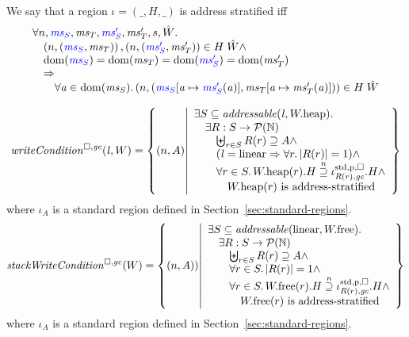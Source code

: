 \documentclass[a4paper]{article}
\begin{document}
\begin{definition}
  \label{def:address-stratified}
  We say that a region $\iota = (\_,H,\_)$ is address stratified iff
  \[
    \begin{array}{l}
      \forall n, \src{\ms_S},\ms_T,\src{\ms_S'},\ms_T',s,\hat{W}\ldotp \\
      \quad \npair{\stpair{\ms}{\ms}}, \npair{\stpair[.]{\ms_S'}{\ms_T'}} \in H \; \hat{W} \wedge \\
      \quad \dom(\src{\ms_S}) = \dom(\ms_T) = \dom(\src{\ms_S'}) = \dom(\ms_T') \\
      \quad \Rightarrow \\
      \qquad \forall \aaddr \in \dom(\ms_S) \ldotp \npair{(\src{\ms_S}\update{\aaddr}{\src{\ms_S'}(\aaddr)},\ms_T\update{\aaddr}{\ms_T'(\aaddr)})} \in H \; \hat{W}
    \end{array}
  \]
\end{definition}

\[
  \writeCond{\lin,W} = \left\{ \npair{A} \middle| 
    \begin{array}{l}
      \exists S \subseteq \addressable{\lin, \pwheap} \ldotp \\
      \quad \exists R : S \fun \powerset{\nats} \\
      \qquad \biguplus_{r\in S} R(r) \supseteq A \wedge\\
      \qquad (\lin = \linear \Rightarrow \forall r\ldotp |R(r)|  = 1) \wedge\\
      \qquad \forall r \in S \ldotp \pwheap(r).H \nsupeq \stdreg{R(r),\gc}{\pur}.H \wedge\\
      \qquad \quad \pwheap(r) \text{ is address-stratified}
    \end{array}
  \right\}
\]
where $\iota_A$ is a standard region defined in Section~\ref{sec:standard-regions}.
\[
  \stackWriteCond{W} = \left\{ \npair{A}) \middle| 
    \begin{array}{l}
      \exists S \subseteq \addressable{\linear, \pwfree} \ldotp \\
      \quad \exists R : S \fun \powerset{\nats} \\
      \qquad \biguplus_{r\in S} R(r) \supseteq A \wedge \\
      \qquad \forall r \in S \ldotp |R(r)| = 1 \wedge \\
      \qquad \forall r \in S \ldotp \pwfree(r).H \nsupeq \stdreg{R(r),\gc}{\pur}.H \wedge\\
      \qquad \quad \pwfree(r) \text{ is address-stratified}
    \end{array}
  \right\}
\]
where $\iota_A$ is a standard region defined in Section~\ref{sec:standard-regions}.
\end{document}

